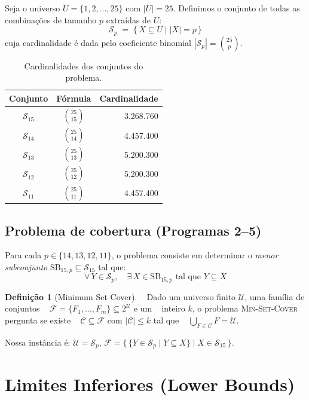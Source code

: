 \documentclass[12pt,a4paper]{article}
\theoremstyle{definition}
\newtheorem{definition}[theorem]{Definição}
\newcommand{\C}[2]{\binom{#1}{#2}}
\newcommand{\SB}{\mathrm{SB}}
\begin{document}
Seja o universo $U = \{1, 2, \ldots, 25\}$ com $|U| = 25$.
Definimos o conjunto de todas as combinações de tamanho $p$ extraídas de $U$:
\[
  \mathcal{S}_p \;=\; \bigl\{\, X \subseteq U \;\big|\; |X| = p \,\bigr\}
\]
cuja cardinalidade é dada pelo coeficiente binomial $|\mathcal{S}_p| = \C{25}{p}$.

\begin{table}[H]
\centering
\caption{Cardinalidades dos conjuntos do problema.}
\begin{tabular}{ccr}
\toprule
Conjunto & Fórmula & Cardinalidade \\
\midrule
$\mathcal{S}_{15}$ & $\C{25}{15}$ & 3.268.760 \\
$\mathcal{S}_{14}$ & $\C{25}{14}$ & 4.457.400 \\
$\mathcal{S}_{13}$ & $\C{25}{13}$ & 5.200.300 \\
$\mathcal{S}_{12}$ & $\C{25}{12}$ & 5.200.300 \\
$\mathcal{S}_{11}$ & $\C{25}{11}$ & 4.457.400 \\
\bottomrule
\end{tabular}
\end{table}

\subsection{Problema de cobertura (Programas 2--5)}

Para cada $p \in \{14, 13, 12, 11\}$, o problema consiste em determinar o
\emph{menor subconjunto} $\SB_{15,p} \subseteq \mathcal{S}_{15}$ tal que:
\[
  \forall\, Y \in \mathcal{S}_p,\quad \exists\, X \in \SB_{15,p} \text{ tal que } Y \subseteq X
\]

\begin{definition}[Minimum Set Cover]
  Dado um universo finito $\mathcal{U}$, uma família de conjuntos
  $\mathcal{F} = \{F_1, \ldots, F_m\} \subseteq 2^{\mathcal{U}}$ e um
  inteiro $k$, o problema \textsc{Min-Set-Cover} pergunta se existe
  $\mathcal{C} \subseteq \mathcal{F}$ com $|\mathcal{C}| \leq k$ tal que
  $\bigcup_{F \in \mathcal{C}} F = \mathcal{U}$.
\end{definition}

Nossa instância é:
$\mathcal{U} = \mathcal{S}_p$,\quad
$\mathcal{F} = \bigl\{\, \{Y \in \mathcal{S}_p \mid Y \subseteq X\} \;\big|\; X \in \mathcal{S}_{15} \,\bigr\}$.

\section{Limites Inferiores (Lower Bounds)}
\end{document}
